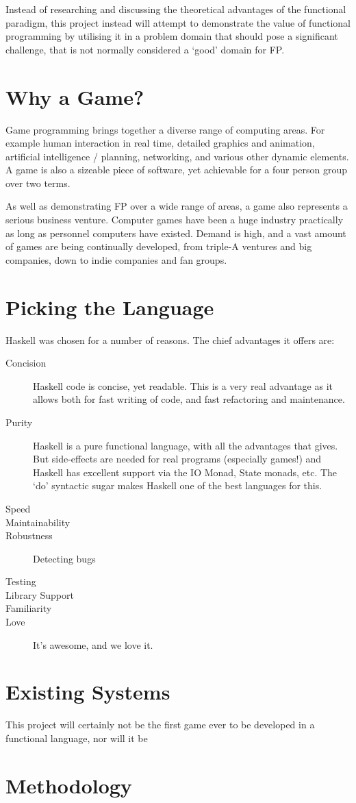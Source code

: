Instead of researching and discussing the theoretical advantages of the functional paradigm, this project instead will attempt to demonstrate the value of functional programming by utilising it in a problem domain that should pose a significant  challenge, that is not normally considered a `good' domain for FP. 

\section{Why a Game?}

Game programming brings together a diverse range of computing areas. For example human interaction in real time, detailed graphics and animation, artificial intelligence / planning, networking, and various other dynamic elements. A game is also a sizeable piece of software, yet achievable for a four person group over two terms.

As well as demonstrating FP over a wide range of areas, a game also represents a serious business venture. Computer games have been a huge industry practically as long as personnel computers have existed. Demand is high, and a vast amount of games are being continually developed, from triple-A ventures and big companies, down to indie companies and fan groups. 

\section{Picking the Language}

Haskell was chosen for a number of reasons. The chief advantages it offers are:

\begin{description}
	\item[Concision] Haskell code is concise, yet readable. This is a very real advantage as it allows both for fast writing of code, and fast refactoring and maintenance. 
	\item[Purity] Haskell is a pure functional language, with all the advantages that gives. But side-effects are needed for real programs (especially games!) and Haskell has excellent support via the IO Monad, State monads, etc. The `do' syntactic sugar makes Haskell one of the best languages for this.
	\item[Speed] 
	\item[Maintainability] 
	\item[Robustness] Detecting bugs
	\item[Testing] 
	\item[Library Support] 
	\item[Familiarity] 
	\item[Love] It's awesome, and we love it.
\end{description}

\section{Existing Systems}

This project will certainly not be the first game ever to be developed in a functional language, nor will it be 

\section{Methodology}
